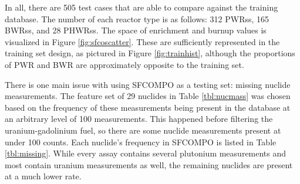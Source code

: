 In all, there are 505 test cases that are able to compare against the training
database.  The number of each reactor type is as follows: 312 \glspl{PWR}s, 165
\glspl{BWR}s, and 28 \glspl{PHWR}s. The space of enrichment and burnup values
is visualized in Figure \ref{fig:sfcoscatter}. These are sufficiently
represented in the training set design, as pictured in Figure
\ref{fig:trainhist}, although the proportions of \gls{PWR} and \gls{BWR} are
approximately opposite to the training set. 

There is one main issue with using \gls{SFCOMPO} as a testing set: missing
nuclide measurements.  The feature set of 29 nuclides in Table
\ref{tbl:nucmass} was chosen based on the frequency of these measurements being
present in the database at an arbitrary level of 100 measurements. This
happened before filtering the uranium-gadolinium fuel, so there are some
nuclide measurements present at under 100 counts.  Each nuclide's frequency in
\gls{SFCOMPO} is listed in Table \ref{tbl:missing}.  While every assay contains
several plutonium measurements and most contain uranium measurements as well,
the remaining nuclides are present at a much lower rate. 

